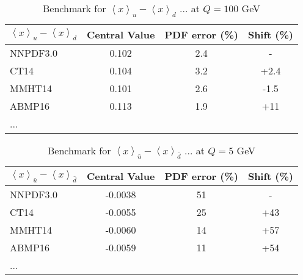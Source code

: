 \begin{table}[t]
\renewcommand{\arraystretch}{1.2} 
\centering
\begin{tabular}{@{}lccc@{}}
\hline 
\rule[-3 ex]{0pt}{7 ex}  %
$\left\langle x\right\rangle _{u}-\left\langle x\right\rangle _{d}$ 
   & Central Value & PDF error (\%) & Shift (\%) \\
\hline 
NNPDF3.0 & 0.102 & 2.4 & -\\
CT14 & 0.104 & 3.2 & +2.4\\
MMHT14 & 0.101 & 2.6 & -1.5\\
ABMP16 & 0.113 & 1.9 & +11\\
... &  &  & \\
\hline 
\end{tabular}
\caption{Benchmark for $\left\langle x\right\rangle _{u}-\left\langle x\right\rangle _{d}$
... at $Q=100$ GeV}
\end{table}

\begin{table}[t]
\renewcommand{\arraystretch}{1.2} 
\centering
\begin{tabular}{@{}lccc@{}}
\hline 
\rule[-3 ex]{0pt}{7 ex}  %
$\left\langle x\right\rangle _{\bar{u}}-\left\langle x\right\rangle _{\bar{d}}$ 
   & Central Value & PDF error (\%) & Shift (\%)\\
\hline 
NNPDF3.0 & -0.0038 & 51 & -\\
CT14 & -0.0055 & 25 & +43\\
MMHT14 & -0.0060 & 14 & +57\\
ABMP16 & -0.0059 & 11 & +54\\
... &  &  & \\
\hline 
\end{tabular}
\caption{Benchmark for $\left\langle x\right\rangle _{\bar{u}}-\left\langle x\right\rangle _{\bar{d}}$
... at $Q=5$ GeV}
\end{table}

